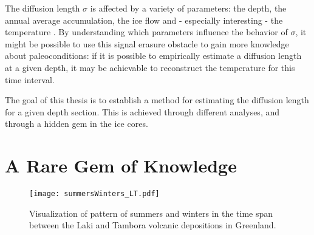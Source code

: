 \documentclass[../../CompleteThesis2/Complete_2ndDraft]{subfiles}
\begin{document}
The diffusion length $\sigma$ is affected by a variety of parameters: the depth, the annual average accumulation, the ice flow and - especially interesting - the temperature \cite[C. Holme et al., 2018]{Holme2018}. By understanding which parameters influence the behavior of $\sigma$, it might be possible to use this signal erasure obstacle to gain more knowledge about paleoconditions: if it is possible to empirically estimate a diffusion length at a given depth, it may be achievable to reconstruct the temperature for this time interval.

The goal of this thesis is to establish a method for estimating the diffusion length for a given depth section. This is achieved through different analyses, and through a hidden gem in the ice cores.
	
\section[A Rare Gem]{A Rare Gem of Knowledge}
\label{Sec:RareGem}
\begin{figure}
	\centering
	\texttt{[image: summersWinters\_LT.pdf]}
	\caption[Summers and Winters between Laki and Tambora]{Visualization of pattern of summers and winters in the time span between the Laki and Tambora volcanic depositions in Greenland.}
	\label{Fig:LakiTamb_SummerWinter}
\end{figure}
	
\end{document}
